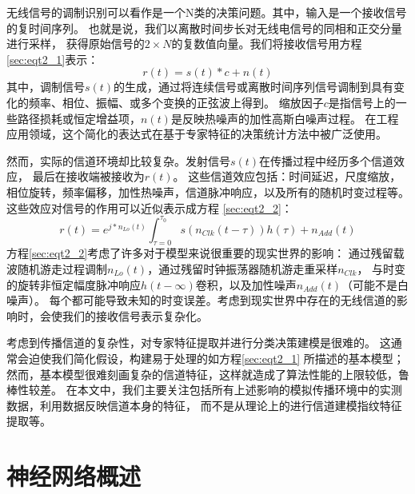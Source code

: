 无线信号的调制识别可以看作是一个N类的决策问题。其中，输入是一个接收信号的复时间序列。
也就是说，我们以离散时间步长对无线电信号的同相和正交分量进行采样，
获得原始信号的$2 \times N$的复数值向量。我们将接收信号用方程\eqref{sec:eqt2_1}表示：
\begin{equation}\label{sec:eqt2_1}
r(t) = s(t)*c + n(t)
\end{equation}
其中，调制信号$s(t)$的生成，通过将连续信号或离散时间序列信号调制到具有变化的频率、相位、振幅、或多个变换的正弦波上得到。
缩放因子$c$是指信号上的一些路径损耗或恒定增益项，$n(t)$是反映热噪声的加性高斯白噪声过程。
在工程应用领域，这个简化的表达式在基于专家特征的决策统计方法中被广泛使用。\par

然而，实际的信道环境却比较复杂。发射信号$s(t)$在传播过程中经历多个信道效应， 最后在接收端被接收为$r(t)$。
这些信道效应包括：时间延迟，尺度缩放，相位旋转，频率偏移，加性热噪声，信道脉冲响应，以及所有的随机时变过程等。 
这些效应对信号的作用可以近似表示成方程 \eqref{sec:eqt2_2}：
\begin{equation}\label{sec:eqt2_2}
r(t) = e^{j*n_{Lo}(t)} \int_{\tau=0}^{\tau_{0}} s(n_{Clk}(t-\tau))h(\tau) + n_{Add}(t)
\end{equation}
方程\eqref{sec:eqt2_2}考虑了许多对于模型来说很重要的现实世界的影响：
通过残留载波随机游走过程调制$n_{Lo}(t)$，通过残留时钟振荡器随机游走重采样$n_{Clk}$，
与时变的旋转非恒定幅度脉冲响应$h(t-∞)$卷积，以及加性噪声$n_{Add}(t)$（可能不是白噪声）。
每个都可能导致未知的时变误差。考虑到现实世界中存在的无线信道的影响时，会使我们的接收信号表示复杂化。\par

考虑到传播信道的复杂性，对专家特征提取并进行分类决策建模是很难的。
这通常会迫使我们简化假设，构建易于处理的如方程\eqref{sec:eqt2_1} 所描述的基本模型；
然而，基本模型很难刻画复杂的信道特征，这样就造成了算法性能的上限较低，鲁棒性较差。
在本文中，我们主要关注包括所有上述影响的模拟传播环境中的实测数据，利用数据反映信道本身的特征，
而不是从理论上的进行信道建模指纹特征提取等。\par

\section{神经网络概述}

